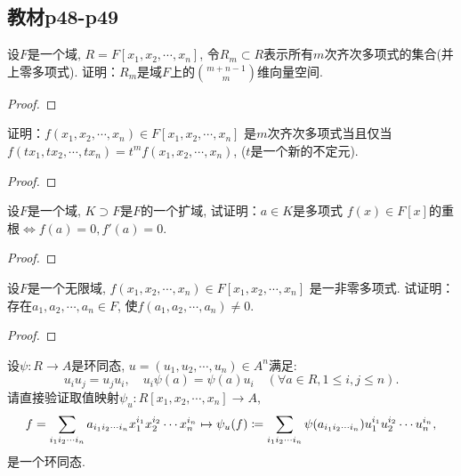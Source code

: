 \subsection{教材p48-p49}

\begin{problem}
    设$F$是一个域, $R = F[x_1, x_2, \cdots, x_n]$,
令$R_m \subset R$表示所有$m$次齐次多项式的集合(并上零多项式).
证明：$R_m$是域$F$上的$\binom{m + n - 1}{m}$维向量空间.
\end{problem}

\begin{proof}
    
\end{proof}

\begin{problem}
    证明：$f(x_1, x_2, \cdots, x_n) \in F[x_1, x_2, \cdots, x_n]$
是$m$次齐次多项式当且仅当$f(tx_1, tx_2, \cdots, tx_n) = t^mf(x_1, x_2, \cdots, x_n)$,
($t$是一个新的不定元).
\end{problem}

\begin{proof}
    
\end{proof}

\begin{problem}
    设$F$是一个域, $K \supset F$是$F$的一个扩域, 试证明：$a\in K$是多项式
$f(x) \in F[x]$的重根$\Leftrightarrow f(a) = 0, f'(a) = 0$.
\end{problem}

\begin{proof}
    
\end{proof}

\begin{problem}
    设$F$是一个无限域, $f(x_1, x_2, \cdots ,x_n) \in F[x_1, x_2, \cdots,x_n]$
是一非零多项式. 试证明：存在$a_1, a_2, \cdots, a_n \in F$,
使$f(a_1, a_2, \cdots, a_n) \neq 0$.
\end{problem}

\begin{proof}
    
\end{proof}

\begin{problem}
    设$\psi:R \to A$是环同态,
$u = (u_1, u_2, \cdots, u_n) \in A^n$满足:
\[
    u_iu_j = u_ju_i,\quad u_i\psi(a) = \psi(a)u_i \quad (\forall a \in R, 1 \leqslant i, j \leqslant n).
\]
请直接验证取值映射$\psi_u:R[x_1, x_2, \cdots, x_n] \to A$,
\[
    f = \sum_{i_1i_2\cdots i_n} a_{i_1i_2\cdots i_n}x_1^{i_1}x_2^{i_2}\cdots x_n^{i_n}
    \mapsto \psi_u(f) \mathrel{\coloneqq} \sum_{i_1i_2\cdots i_n} \psi(a_{i_1i_2\cdots i_n})u_1^{i_1}u_2^{i_2}\cdots u_n^{i_n},
\]
是一个环同态.
\end{problem}


